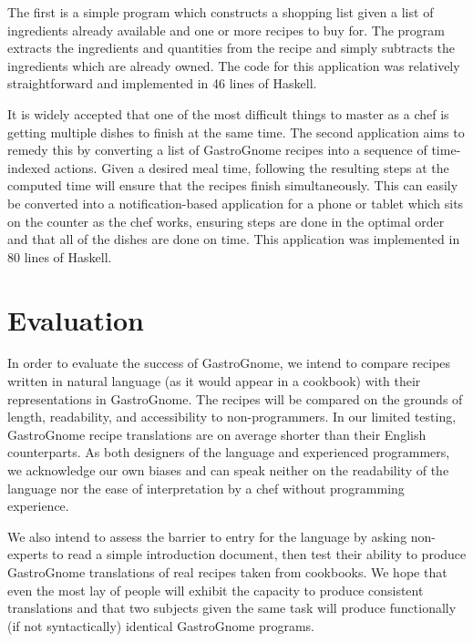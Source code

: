 \documentclass[pldi]{sigplanconf-pldi15}
\begin{document}
The first is a simple program which constructs a shopping list given a list of
ingredients already available and one or more recipes to buy for. The program
extracts the ingredients and quantities from the recipe and simply subtracts
the ingredients which are already owned. The code for this application was
relatively straightforward and implemented in 46 lines of Haskell.

It is widely accepted that one of the most difficult things to master as a
chef is getting multiple dishes to finish at the same time. The second
application aims to remedy this by converting a list of GastroGnome recipes
into a sequence of time-indexed actions. Given a desired meal time, following
the resulting steps at the computed time will ensure that the recipes finish
simultaneously. This can easily be converted into a notification-based
application for a phone or tablet which sits on the counter as the chef works,
ensuring steps are done in the optimal order and that all of the dishes are
done on time. This application was implemented in 80 lines of Haskell.

\section{Evaluation}
In order to evaluate the success of GastroGnome, we intend to compare recipes
written in natural language (as it would appear in a cookbook) with their
representations in GastroGnome. The recipes will be compared on the grounds of
length, readability, and accessibility to non-programmers. In our limited
testing, GastroGnome recipe translations are on average shorter than their
English counterparts. As both designers of the language and experienced
programmers, we acknowledge our own biases and can speak neither on the
readability of the language nor the ease of interpretation by a chef without
programming experience.

We also intend to assess the barrier to entry for the language by asking
non-experts to read a simple introduction document, then test their ability to
produce GastroGnome translations of real recipes taken from cookbooks. We hope
that even the most lay of people will exhibit the capacity to produce
consistent translations and that two subjects given the same task will produce
functionally (if not syntactically) identical GastroGnome programs.
\end{document}
